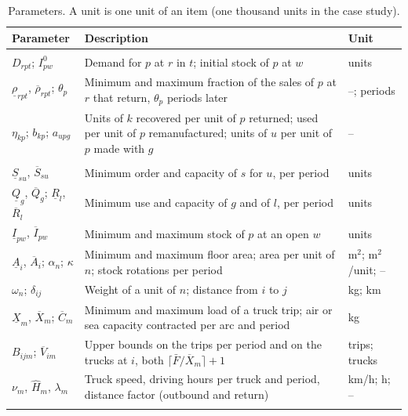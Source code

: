 \documentclass[review,11pt,nonatbib]{elsarticle}
\theoremstyle{remark}
\begin{document}
\begin{table}[!htbp]
\centering
\caption{Parameters. A unit is one unit of an item (one thousand units in the case study).}\label{tab:parameters}
\footnotesize
\begin{tabularx}{\textwidth}{@{}>{\raggedright\arraybackslash}p{3.3cm}L>{\raggedright\arraybackslash}p{2.6cm}@{}}
\toprule
Parameter & Description & Unit \\
\midrule
{} \\
$D_{rpt}$; $I^0_{pw}$ & Demand for $p$ at $r$ in $t$; initial stock of $p$ at $w$ & units \\
$\underline{\rho}_{rpt}$, $\overline{\rho}_{rpt}$; $\theta_p$ & Minimum and maximum fraction of the sales of $p$ at $r$ that return, $\theta_p$ periods later & --; periods \\
$\eta_{kp}$; $b_{kp}$; $a_{upg}$ & Units of $k$ recovered per unit of $p$ returned; used per unit of $p$ remanufactured; units of $u$ per unit of $p$ made with $g$ & -- \\
 \\
$\underline{S}_{su}$, $\overline{S}_{su}$ & Minimum order and capacity of $s$ for $u$, per period & units \\
$\underline{Q}_g$, $\overline{Q}_g$; $\underline{R}_l$, $\overline{R}_l$ & Minimum use and capacity of $g$ and of $l$, per period & units \\
$\underline{I}_{pw}$, $\overline{I}_{pw}$ & Minimum and maximum stock of $p$ at an open $w$ & units \\
$\underline{A}_i$, $\overline{A}_i$; $\alpha_n$; $\kappa$ & Minimum and maximum floor area; area per unit of $n$; stock rotations per period & m$^2$; m$^2$/unit; -- \\
$\omega_n$; $\delta_{ij}$ & Weight of a unit of $n$; distance from $i$ to $j$ & kg; km \\
$\underline{X}_m$, $\overline{X}_m$; $\overline{C}_m$ & Minimum and maximum load of a truck trip; air or sea capacity contracted per arc and period & kg \\
$B_{ijm}$; $\overline{V}_{im}$ & Upper bounds on the trips per period and on the trucks at $i$, both $\lceil \bar{F}/\overline{X}_m \rceil + 1$ & trips; trucks \\
$\nu_m$, $\hat{H}_m$, $\lambda_m$ & Truck speed, driving hours per truck and period, distance factor (outbound and return) & km/h; h; -- \\
 \\

\end{tabularx}
\end{table}
\end{document}
